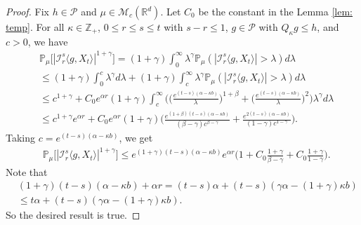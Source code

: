 \documentclass[12pt,a4paper]{amsart}
\theoremstyle{plain}
\theoremstyle{definition}
\numberwithin{equation}{section}
\begin{document}
\begin{proof}
  Fix $h \in \mathcal P$ and $\mu \in \mathcal M_c(\mathbb R^d)$. Let $C_0$ be the constant in the Lemma \ref{lem: temp}.
  For all $\kappa \in \mathbb Z_+$,  $0\leq r\leq s\leq t$ with $s-r \leq 1$,  $g\in \mathcal P$ with $Q_{\kappa} g \leq h$, and $c>0$, we have
  \begin{align}
    & \mathbb P_\mu\big[|\mathcal I_r^s\langle g, X_t\rangle|^{1+\gamma}\big]
      = (1+\gamma)\int_0^\infty \lambda^{\gamma} \mathbb P_{\mu}(|\mathcal I_r^s\langle g, X_t\rangle|>\lambda) d\lambda \\
    & \leq (1+\gamma)\int_0^c \lambda^{\gamma} d\lambda +(1+\gamma)\int_c^\infty \lambda^{\gamma}\mathbb P_\mu(|\mathcal I_r^s\langle g, X_t\rangle|> \lambda) d\lambda \\
    & \leq c^{1+\gamma} + C_0  e^{\alpha r}(1+\gamma)\int_c^\infty \bigg(\Big(\frac{e^{(t-s)(\alpha - \kappa b)}}{\lambda}\Big)^{1+\beta}+\Big(\frac{e^{(t-s)(\alpha - \kappa b)}}{\lambda}\Big)^{2}\bigg)\lambda^{\gamma}d\lambda \\
    & \leq c^{1+\gamma} e^{\alpha r} + C_0e^{\alpha r}(1+\gamma)\Big(  \frac{e^{(1+\beta)(t-s)(\alpha- \kappa b)}}{(\beta - \gamma)c^{\beta - \gamma}}  + \frac{e^{2(t-s)(\alpha- \kappa b)}}{(1 - \gamma)c^{1 - \gamma}} \Big).
  \end{align}
  Taking $c = e^{(t-s)(\alpha- \kappa b)}$, we get
  \begin{align}
    & \mathbb P_\mu\big[|\mathcal I_r^s\langle g, X_t\rangle|^{1+\gamma}\big]
      \leq e^{(1+\gamma)(t-s)(\alpha- \kappa b)} e^{\alpha r}\Big(1+ C_0 \frac{1+\gamma}{\beta - \gamma}+ C_0 \frac{1+\gamma}{1 - \gamma}\Big).
  \end{align}
  Note that
  \begin{align}
    & (1+\gamma) (t-s) (\alpha- \kappa b) + \alpha r
      = (t-s)\alpha+(t-s) (\gamma \alpha- (1+\gamma )\kappa b) \\
    & \leq t\alpha+(t-s) (\gamma \alpha- (1+\gamma)\kappa b).
  \end{align}
  So the desired result is true.
\end{proof}
\end{document}

